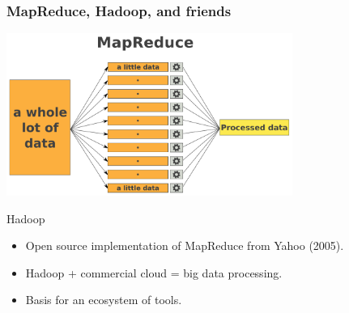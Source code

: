 
\begin{frame}
\frametitle{MapReduce, Hadoop, and friends}
\begin{center}
\includegraphics[width=0.7\textwidth]{graphics/mapreduce.pdf}

\pause

\begin{block}{Hadoop}
\begin{itemize}
	\item Open source implementation of MapReduce from Yahoo (2005).
	\item Hadoop + commercial cloud = big data processing.
	\item Basis for an ecosystem of tools.
\end{itemize}
\end{block}
\end{center}
\end{frame}


